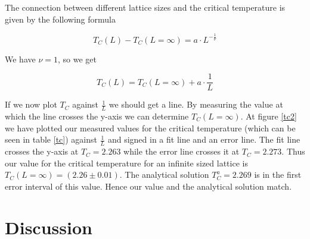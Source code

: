 \documentclass[10pt,a4paper]{article}
\begin{document}

The connection between different lattice sizes and the critical temperature is given by the following formula

\begin{equation}
T_C(L) - T_C(L = \infty) = a \cdot L^{-\frac{1}{\nu}}
\end{equation}

We have $\nu = 1$, so we get

\begin{equation}
T_C(L) = T_C(L = \infty) + a \cdot \frac{1}{L}
\end{equation}

If we now plot $T_C$ against $\frac{1}{L}$ we should get a line. By measuring the value at which the line crosses the y-axis we can determine $T_C(L = \infty)$. At figure \ref*{tc2} we have plotted our measured values for the critical temperature (which can be seen in table \ref*{tc}) against $\frac{1}{L}$ and signed in a fit line and an error line. The fit line crosses the y-axis at $T_C = 2.263$ while the error line crosses it at $T_C = 2.273$. Thus our value for the critical temperature for an infinite sized lattice is $T_C(L = \infty) = (2.26 \pm 0.01)$. The analytical solution $T_C^{a} = 2.269$ is in the first error interval of this value. Hence our value and the analytical solution match.


\clearpage

\section{Discussion}
\end{document}
